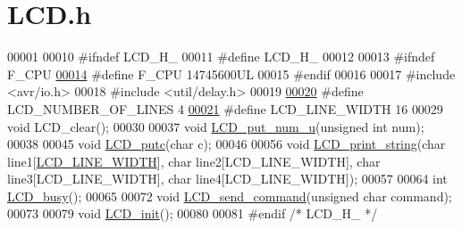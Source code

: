 \hypertarget{_l_c_d_8h_source}{}\section{L\+C\+D.\+h}
\label{_l_c_d_8h_source}

\begin{DoxyCode}
00001 
00010 \textcolor{preprocessor}{#ifndef LCD\_H\_}
00011 \textcolor{preprocessor}{#define LCD\_H\_}
00012 
00013 \textcolor{preprocessor}{#ifndef F\_CPU}
\hypertarget{_l_c_d_8h_source.tex_l00014}{}\hyperlink{_l_c_d_8h_a43bafb28b29491ec7f871319b5a3b2f8}{00014} \textcolor{preprocessor}{#define F\_CPU 14745600UL}
00015 \textcolor{preprocessor}{#endif}
00016 
00017 \textcolor{preprocessor}{#include <avr/io.h>}
00018 \textcolor{preprocessor}{#include <util/delay.h>}
00019 
\hypertarget{_l_c_d_8h_source.tex_l00020}{}\hyperlink{_l_c_d_8h_a5bb24c05980471cbc9086fef965deacc}{00020} \textcolor{preprocessor}{#define LCD\_NUMBER\_OF\_LINES 4 }
\hypertarget{_l_c_d_8h_source.tex_l00021}{}\hyperlink{_l_c_d_8h_a5bdd8750b215c775f2227262a1934b54}{00021} \textcolor{preprocessor}{#define LCD\_LINE\_WIDTH 16 }
00029 \textcolor{preprocessor}{void LCD\_clear();}
00030 
00037 \textcolor{keywordtype}{void} \hyperlink{_l_c_d_8h_ab7c7379b10d76669edf03099f799b357}{LCD\_put\_num\_u}(\textcolor{keywordtype}{unsigned} \textcolor{keywordtype}{int} num);
00038 
00045 \textcolor{keywordtype}{void} \hyperlink{_l_c_d_8h_a7a19aaec7f9deb1589a7efddf3da8d3f}{LCD\_putc}(\textcolor{keywordtype}{char} c);
00046 
00056 \textcolor{keywordtype}{void} \hyperlink{_l_c_d_8h_afbc155e4e9d279ccd12c2695fe78a0e3}{LCD\_print\_string}(\textcolor{keywordtype}{char} line1[\hyperlink{_l_c_d_8h_a5bdd8750b215c775f2227262a1934b54}{LCD\_LINE\_WIDTH}], \textcolor{keywordtype}{char} line2[LCD\_LINE\_WIDTH],
       \textcolor{keywordtype}{char} line3[LCD\_LINE\_WIDTH], \textcolor{keywordtype}{char} line4[LCD\_LINE\_WIDTH]);
00057 
00064 \textcolor{keywordtype}{int} \hyperlink{_l_c_d_8h_a6679ea6f481524d1b6a30c4d99b8aad5}{LCD\_busy}();
00065 
00072 \textcolor{keywordtype}{void} \hyperlink{_l_c_d_8h_aa6d8c104e37eef62ba3a6046d1333ca6}{LCD\_send\_command}(\textcolor{keywordtype}{unsigned} \textcolor{keywordtype}{char} command);
00073 
00079 \textcolor{keywordtype}{void} \hyperlink{_l_c_d_8h_a0742e25c23ca1096ceba081b98fd58ba}{LCD\_init}();
00080 
00081 \textcolor{preprocessor}{#endif }\textcolor{comment}{/* LCD\_H\_ */}\textcolor{preprocessor}{}
\end{DoxyCode}
